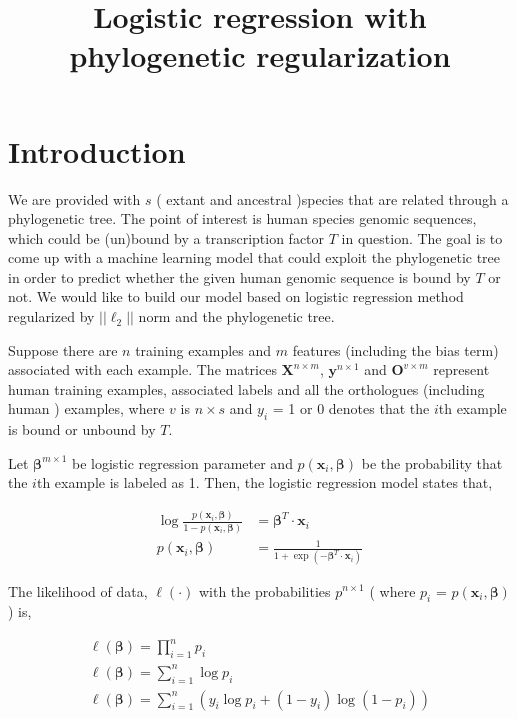 \documentclass[14 pt]{article}
\title{Logistic regression with phylogenetic regularization}
\date{}
\begin{document}
\maketitle

\section{Introduction}

We are provided with $s$ ( extant and ancestral )species that are related through a phylogenetic tree. The point of interest is human species genomic sequences, which could be (un)bound by a transcription factor $T$ in question. The goal is to come up with a machine learning model that could exploit the phylogenetic tree in order to predict whether the given human genomic sequence is bound by $T$ or not. We would like to build our model based on logistic regression method regularized by $||\ell_2||$ norm and the phylogenetic tree. 

Suppose there are $n$ training examples and $m$ features (including the bias term) associated with each example. The matrices $\bm{X}^{n\times m}$, $\bm{y}^{n\times 1}$ and $\bm{O}^{v\times m}$ represent human training examples, associated labels and all the orthologues (including human ) examples, where $v$ is $n\times s$ and $y_i$ = 1 or 0 denotes that the $i$th example is bound or unbound by $T$.

Let $\bm{\beta}^{m\times 1}$ be logistic regression parameter and $p( \bm{x}_i, \bm{\beta})$ be the probability that the $i$th example is labeled as 1. Then, the logistic regression model states that,

\begin{eqnarray}
  \log \frac{p( \bm{x}_i, \bm{\beta})}{1-p( \bm{x}_i, \bm{\beta})} &= \bm{\beta}^T \cdot \bm{x}_i \\
  p( \bm{x}_i, \bm{\beta}) &= \frac{1}{ 1 + \exp( -\bm{\beta}^T \cdot \bm{x}_i )}
\end{eqnarray}

The likelihood of data, $\ell(\cdot)$ with the probabilities $p^{n\times 1}$ ( where $p_i$ = $p( \bm{x}_i, \bm{\beta})$) is,

\begin{eqnarray}
	\ell(\bm{\beta}) = \prod_{i=1}^{n} p_i \\
	\ell(\bm{\beta}) = \sum_{i=1}^n \log p_i\\
	\ell(\bm{\beta}) = \sum_{i=1}^{n} ( y_i \log p_i + (1-y_i) \log( 1- p_i ) )
\end{eqnarray}
\end{document}

